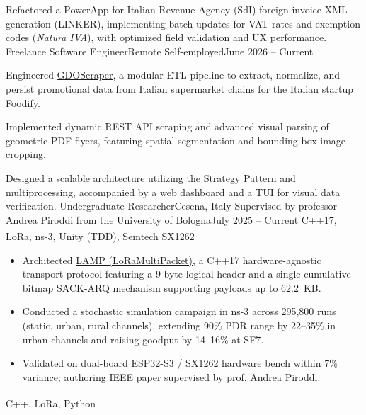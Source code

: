 \documentclass[letterpaper,11pt,english]{article}
\begin{document}
  \item\small{Refactored a PowerApp for Italian Revenue Agency (SdI) foreign invoice XML generation (LINKER), implementing batch updates for VAT rates and exemption codes (\textit{Natura IVA}), with optimized field validation and UX performance.}
\resumeItemListEnd
\resumeSubheading
{Freelance Software Engineer}{Remote}
{Self-employed}{June 2026 -- Current}
\resumeItemListStart
  \item\small{Engineered \href{https://github.com/aleemont1/supermarket-scraper}{GDOScraper}, a modular ETL pipeline to extract, normalize, and persist promotional data from Italian supermarket chains for the Italian startup Foodify.}
  \item\small{Implemented dynamic REST API scraping and advanced visual parsing of geometric PDF flyers, featuring spatial segmentation and bounding-box image cropping.}
  \item\small{Designed a scalable architecture utilizing the Strategy Pattern and multiprocessing, accompanied by a web dashboard and a TUI for visual data verification.}
\resumeItemListEnd
\resumeSubheading
{Undergraduate Researcher}{Cesena, Italy}
{Supervised by professor Andrea Piroddi from the University of Bologna}{July 2025 -- Current}
\resumeItemListStart
{} {C++17, LoRa\textsuperscript{\textcopyright}, ns-3, Unity (TDD), Semtech SX1262}
{
  \begin{itemize}
    \item Architected \href{https://github.com/aleemont1/LAMP}{LAMP (LoRaMultiPacket)}, a C++17 hardware-agnostic transport protocol featuring a 9-byte logical header and a single cumulative bitmap SACK-ARQ mechanism supporting payloads up to 62.2~KB.
    \item Conducted a stochastic simulation campaign in ns-3 across 295,800 runs (static, urban, rural channels), extending 90\% PDR range by 22--35\% in urban channels and raising goodput by 14--16\% at SF7.
    \item Validated on dual-board ESP32-S3 / SX1262 hardware bench within 7\% variance; authoring IEEE paper supervised by prof. Andrea Piroddi.
  \end{itemize}
}
\resumeItemListEnd
{}
\resumeItemListStart
{} {C++, LoRa\textsuperscript{\textcopyright}, Python}
\end{document}
